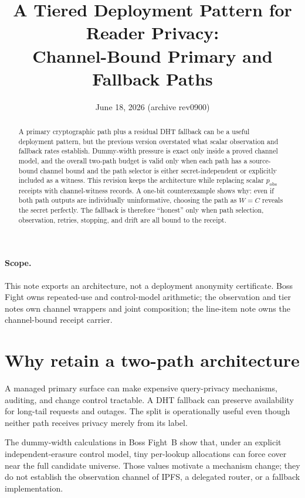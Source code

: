 \documentclass[11pt]{article}
\title{A Tiered Deployment Pattern for Reader Privacy:\\
\large Channel-Bound Primary and Fallback Paths}
\author{}
\date{June 18, 2026 (archive rev0900)}
\begin{document}
\maketitle

\begin{abstract}
A primary cryptographic path plus a residual DHT fallback can be a useful deployment pattern, but the previous version overstated what scalar observation and fallback rates establish. Dummy-width pressure is exact only inside a proved channel model, and the overall two-path budget is valid only when each path has a source-bound channel bound and the path selector is either secret-independent or explicitly included as a witness. This revision keeps the architecture while replacing scalar \(p_{\mathrm{obs}}\) receipts with channel-witness records. A one-bit counterexample shows why: even if both path outputs are individually uninformative, choosing the path as \(W=C\) reveals the secret perfectly. The fallback is therefore ``honest'' only when path selection, observation, retries, stopping, and drift are all bound to the receipt.
\end{abstract}

\paragraph{Scope.}
This note exports an architecture, not a deployment anonymity certificate. Boss Fight owns repeated-use and control-model arithmetic; the observation and tier notes own channel wrappers and joint composition; the line-item note owns the channel-bound receipt carrier.\cite{series:bossfightB,series:obsatten,series:tieredobs,series:receiptitems}

\section{Why retain a two-path architecture}\label{sec:why}
A managed primary surface can make expensive query-privacy mechanisms, auditing, and change control tractable. A DHT fallback can preserve availability for long-tail requests and outages. The split is operationally useful even though neither path receives privacy merely from its label.

The dummy-width calculations in Boss Fight~B show that, under an explicit independent-erasure control model, tiny per-lookup allocations can force cover near the full candidate universe. Those values motivate a mechanism change; they do not establish the observation channel of IPFS, a delegated router, or a fallback implementation.\cite{series:bossfightB}
\end{document}
